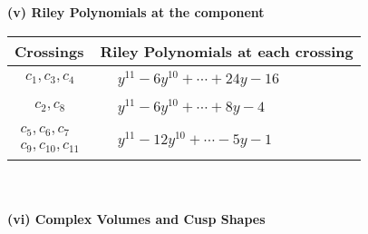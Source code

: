 \documentclass[1p]{elsarticle_modified}
\theoremstyle{definition}
\begin{document}
\newpage\renewcommand{\arraystretch}{1}
\flushleft \textbf{(v) Riley Polynomials at the component}\newline \\
\begin{tabular}{m{50pt}|m{274pt}}
Crossings & \hspace{64pt}Riley Polynomials at each crossing \\
\hline $$\begin{aligned}c_{1},c_{3},c_{4}\end{aligned}$$&$\begin{aligned}
&y^{11}-6 y^{10}+\cdots+24 y-16
\end{aligned}$\\
\hline $$\begin{aligned}c_{2},c_{8}\end{aligned}$$&$\begin{aligned}
&y^{11}-6 y^{10}+\cdots+8 y-4
\end{aligned}$\\
\hline $$\begin{aligned}c_{5},c_{6},c_{7}\\c_{9},c_{10},c_{11}\end{aligned}$$&$\begin{aligned}
&y^{11}-12 y^{10}+\cdots-5 y-1
\end{aligned}$\\
\hline
\end{tabular}\\~\\
\newpage\flushleft \textbf{(vi) Complex Volumes and Cusp Shapes}
\end{document}
